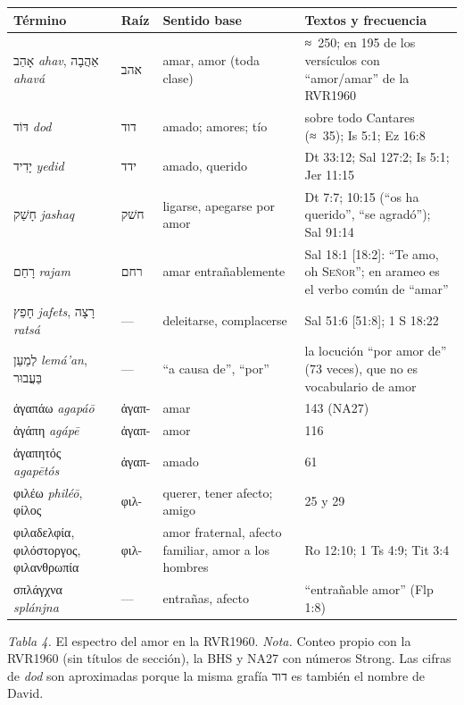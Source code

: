 \documentclass[11pt,letterpaper]{article}
\newcommand{\heb}[1]{\mbox{\foreignlanguage{hebrew}{#1}}}
\newcommand{\grc}[1]{\foreignlanguage{ancientgreek}{#1}}
\newcommand{\SENOR}{\textsc{Señor}}
\begin{document}
\begin{center}\small\renewcommand{\arraystretch}{1.18}
\begin{tabular}{@{}L{4.0cm}L{1.5cm}L{4.4cm}L{5.0cm}@{}}
\toprule
\textbf{Término} & \textbf{Raíz} & \textbf{Sentido base} & \textbf{Textos y frecuencia} \\ \midrule
\heb{אָהַב} \emph{ahav}, \heb{אַהֲבָה} \emph{ahavá} & \heb{אהב} & amar, amor (toda clase) & ≈~250; en 195 de los versículos con ``amor/amar'' de la RVR1960 \\
\heb{דּוֹד} \emph{dod} & \heb{דוד} & amado; amores; tío & sobre todo Cantares (≈~35); Is 5:1; Ez 16:8 \\
\heb{יָדִיד} \emph{yedid} & \heb{ידד} & amado, querido & Dt 33:12; Sal 127:2; Is 5:1; Jer 11:15 \\
\heb{חָשַׁק} \emph{jashaq} & \heb{חשׁק} & ligarse, apegarse por amor & Dt 7:7; 10:15 (``os ha querido'', ``se agradó''); Sal 91:14 \\
\heb{רָחַם} \emph{rajam} & \heb{רחם} & amar entrañablemente & Sal 18:1 [18:2]: ``Te amo, oh \SENOR''; en arameo es el verbo común de ``amar'' \\
\heb{חָפֵץ} \emph{jafets}, \heb{רָצָה} \emph{ratsá} & --- & deleitarse, complacerse & Sal 51:6 [51:8]; 1 S 18:22 \\
\heb{לְמַעַן} \emph{lemá'an}, \heb{בַּעֲבוּר} & --- & ``a causa de'', ``por'' & la locución ``por amor de'' (73 veces), que no es vocabulario de amor \\ \midrule
\grc{ἀγαπάω} \emph{agapáō} & \grc{ἀγαπ-} & amar & 143 (NA27) \\
\grc{ἀγάπη} \emph{agápē} & \grc{ἀγαπ-} & amor & 116 \\
\grc{ἀγαπητός} \emph{agapētós} & \grc{ἀγαπ-} & amado & 61 \\
\grc{φιλέω} \emph{philéō}, \grc{φίλος} & \grc{φιλ-} & querer, tener afecto; amigo & 25 y 29 \\
\grc{φιλαδελφία}, \grc{φιλόστοργος}, \grc{φιλανθρωπία} & \grc{φιλ-} & amor fraternal, afecto familiar, amor a los hombres & Ro 12:10; 1 Ts 4:9; Tit 3:4 \\
\grc{σπλάγχνα} \emph{splánjna} & --- & entrañas, afecto & ``entrañable amor'' (Flp 1:8) \\
\bottomrule
\end{tabular}\par
{\footnotesize\color{gris}\textit{Tabla 4.} El espectro del amor en la RVR1960. \textit{Nota.} Conteo propio con la RVR1960 (sin títulos de sección), la BHS y NA27 con números Strong. Las cifras de \emph{dod} son aproximadas porque la misma grafía \heb{דוד} es también el nombre de David.}
\end{center}
\end{document}
